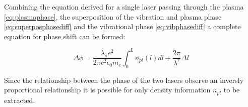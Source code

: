 \documentclass[12pt,a4paper,oneside]{report}
\begin{document}
Combining the equation derived for a single laser passing through the plasma \ref{eq:plasmaphase}, the superposition of the vibration and plasma phase \ref{eq:superposphasediff} and the vibrational phase \ref{eq:vibphasediff} a complete equation for phase shift can be formed:

\begin{equation}
	\Delta\phi = \frac{\lambda_{s} e^{2}}{2 \pi c^{2} \epsilon_{0} m_{e}} \int_{0}^{L} n_{pl} (l) dl + \frac{2\pi}{\lambda^{r}} \Delta l
	\label{eq:heterophasediff}
\end{equation}

Since the relationship between the phase of the two lasers observe an inversly proportional relationship it is possible for only density information $n_{pl}$ to be extracted.
\\


    
\end{document}
